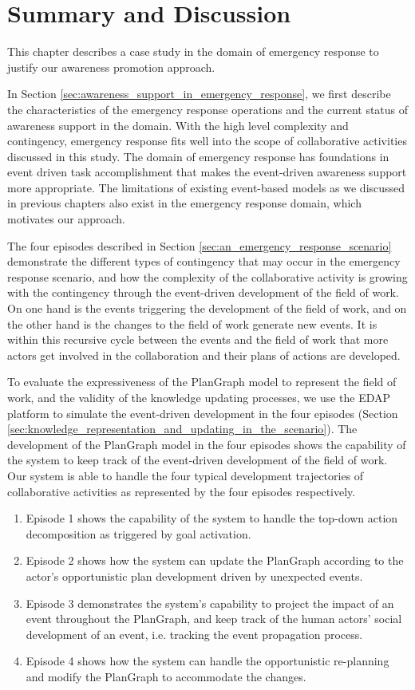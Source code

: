 \section{Summary and Discussion} %
\label{sec:summary_and_discussion}
This chapter describes a case study in the domain of emergency response to justify our awareness promotion approach. 

In Section \ref{sec:awareness_support_in_emergency_response}, we first describe the characteristics of the emergency response operations and the current status of awareness support in the domain. With the high level complexity and contingency, emergency response fits well into the scope of collaborative activities discussed in this study. The domain of emergency response has foundations in event driven task accomplishment that makes the event-driven awareness support more appropriate. The limitations of existing event-based models as we discussed in previous chapters also exist in the emergency response domain, which motivates our approach.

The four episodes described in Section \ref{sec:an_emergency_response_scenario} demonstrate the different types of contingency that may occur in the emergency response scenario, and how the complexity of the collaborative activity is growing with the contingency through the event-driven development of the field of work. On one hand is the events triggering the development of the field of work, and on the other hand is the changes to the field of work generate new events. It is within this recursive cycle between the events and the field of work that more actors get involved in the collaboration and their plans of actions are developed.

To evaluate the expressiveness of the PlanGraph model to represent the field of work, and the validity of the knowledge updating processes, we use the EDAP platform to simulate the event-driven development in the four episodes (Section \ref{sec:knowledge_representation_and_updating_in_the_scenario}). The development of the PlanGraph model in the four episodes shows the capability of the system to keep track of the event-driven development of the field of work. Our system is able to handle the four typical development trajectories of collaborative activities as represented by the four episodes respectively. 

\begin{enumerate}
	\item Episode 1 shows the capability of the system to handle the top-down action decomposition as triggered by goal activation.
	\item Episode 2 shows how the system can update the PlanGraph according to the actor's opportunistic plan development driven by unexpected events.
	\item Episode 3 demonstrates the system's capability to project the impact of an event throughout the PlanGraph, and keep track of the human actors' social development of an event, i.e. tracking the event propagation process.
	\item Episode 4 shows how the system can handle the opportunistic re-planning and modify the PlanGraph to accommodate the changes.
\end{enumerate}

